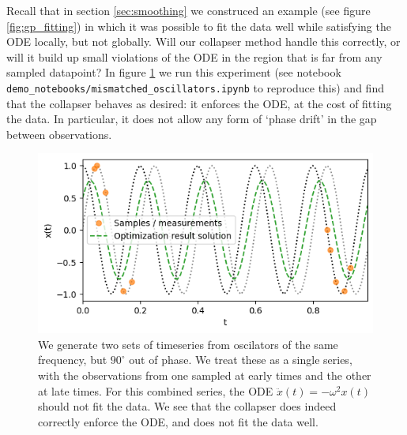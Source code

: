 \documentclass{article}
\begin{document}
Recall that in section \ref{sec:smoothing} we construced an example (see figure \ref{fig:gp_fitting}) in which it was possible to fit the data well while satisfying the ODE locally, but not globally.
Will our collapser method handle this correctly, or will it build up small violations of the ODE in the region that is far from any sampled datapoint?
In figure \ref{fig:mismatched_oscillators} we run this experiment (see notebook \texttt{demo\_notebooks/mismatched\_oscillators.ipynb} to reproduce this) and find that the collapser behaves as desired: it enforces the ODE, at the cost of fitting the data.
In particular, it does not allow any form of `phase drift' in the gap between observations.

\begin{figure}
\includegraphics{images/results/mismatched_oscillators.png}
\centering
\caption{
We generate two sets of timeseries from oscilators of the same frequency, but $90^{\circ}$ out of phase.
We treat these as a single series, with the observations from one sampled at early times and the other at late times.
For this combined series, the ODE $\ddot{x}(t) = - \omega^2 x(t)$ should not fit the data.
We see that the collapser does indeed correctly enforce the ODE, and does not fit the data well.
}
\label{fig:mismatched_oscillators}
\end{figure}





\end{document}
